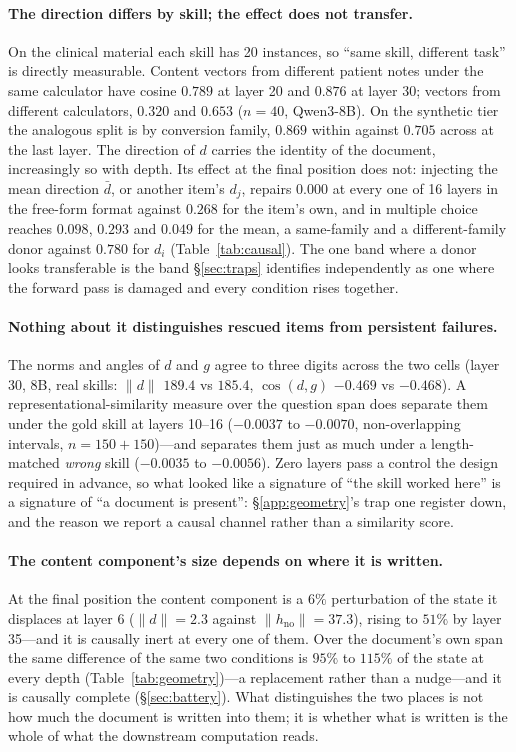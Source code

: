 \documentclass{article}
\newcommand{\dvec}{\ensuremath{d}}
\newcommand{\gvec}{\ensuremath{g}}
\begin{document}
\paragraph{The direction differs by skill; the effect does not transfer.}
On the clinical material each skill has 20 instances, so ``same skill, different
task'' is directly measurable. Content vectors from different patient notes under
the same calculator have cosine $0.789$ at layer 20 and $0.876$ at layer 30;
vectors from different calculators, $0.320$ and $0.653$ ($n=40$, Qwen3-8B). On
the synthetic tier the analogous split is by conversion family, $0.869$ within
against $0.705$ across at the last layer. The direction of $\dvec$ carries the
identity of the document, increasingly so with depth. Its effect at the final
position does not: injecting the mean direction $\bar{\dvec}$, or another item's
$\dvec_j$, repairs $0.000$ at every one of 16 layers in the free-form format
against $0.268$ for the item's own, and in multiple choice reaches $0.098$,
$0.293$ and $0.049$ for the mean, a same-family and a different-family donor
against $0.780$ for $\dvec_i$ (Table~\ref{tab:causal}). The one band where a
donor looks transferable is the band \S\ref{sec:traps} identifies independently
as one where the forward pass is damaged and every condition rises together.

\paragraph{Nothing about it distinguishes rescued items from persistent
failures.} The norms and angles of $\dvec$ and $\gvec$ agree to three digits
across the two cells (layer 30, 8B, real skills: $\|\dvec\|$ $189.4$ vs $185.4$,
$\cos(\dvec,\gvec)$ $-0.469$ vs $-0.468$). A representational-similarity measure
over the question span does separate them under the gold skill at layers 10--16
($-0.0037$ to $-0.0070$, non-overlapping intervals, $n=150+150$)---and separates
them just as much under a length-matched \emph{wrong} skill ($-0.0035$ to
$-0.0056$). Zero layers pass a control the design required in advance, so what
looked like a signature of ``the skill worked here'' is a signature of ``a
document is present'': \S\ref{app:geometry}'s trap one register down, and the
reason we report a causal channel rather than a similarity score.

\paragraph{The content component's size depends on where it is written.} At the
final position the content component is a $6\%$ perturbation of the state it
displaces at layer 6 ($\|\dvec\|=2.3$ against $\|h_{\text{no}}\|=37.3$), rising
to $51\%$ by layer 35---and it is causally inert at every one of them. Over the
document's own span the same difference of the same two conditions is $95\%$ to
$115\%$ of the state at every depth (Table~\ref{tab:geometry})---a replacement
rather than a nudge---and it is causally complete (\S\ref{sec:battery}). What
distinguishes the two places is not how much the document is written into them;
it is whether what is written is the whole of what the downstream computation
reads.
\end{document}
